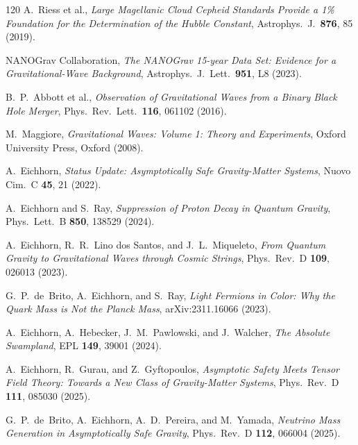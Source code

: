 \documentclass[12pt,a4paper]{article}
\begin{document}
\begin{thebibliography}{120}
A.~Riess et al.,
\textit{Large Magellanic Cloud Cepheid Standards Provide a 1\%
Foundation for the Determination of the Hubble Constant},
Astrophys.\ J.\ \textbf{876}, 85 (2019).


NANOGrav Collaboration,
\textit{The NANOGrav 15-year Data Set: Evidence for a
Gravitational-Wave Background},
Astrophys.\ J.\ Lett.\ \textbf{951}, L8 (2023).

B.~P.~Abbott et al.,
\textit{Observation of Gravitational Waves from a Binary Black Hole Merger},
Phys.\ Rev.\ Lett.\ \textbf{116}, 061102 (2016).

M.~Maggiore,
\textit{Gravitational Waves: Volume 1: Theory and Experiments},
Oxford University Press, Oxford (2008).


A.~Eichhorn,
\textit{Status Update: Asymptotically Safe Gravity-Matter Systems},
Nuovo Cim.\ C \textbf{45}, 21 (2022).

A.~Eichhorn and S.~Ray,
\textit{Suppression of Proton Decay in Quantum Gravity},
Phys.\ Lett.\ B \textbf{850}, 138529 (2024).

A.~Eichhorn, R.~R.~Lino dos Santos, and J.~L.~Miqueleto,
\textit{From Quantum Gravity to Gravitational Waves through Cosmic Strings},
Phys.\ Rev.\ D \textbf{109}, 026013 (2023).

G.~P.~de~Brito, A.~Eichhorn, and S.~Ray,
\textit{Light Fermions in Color: Why the Quark Mass is Not the Planck Mass},
arXiv:2311.16066 (2023).

A.~Eichhorn, A.~Hebecker, J.~M.~Pawlowski, and J.~Walcher,
\textit{The Absolute Swampland},
EPL \textbf{149}, 39001 (2024).

A.~Eichhorn, R.~Gurau, and Z.~Gyftopoulos,
\textit{Asymptotic Safety Meets Tensor Field Theory: Towards a New Class of
Gravity-Matter Systems},
Phys.\ Rev.\ D \textbf{111}, 085030 (2025).

G.~P.~de~Brito, A.~Eichhorn, A.~D.~Pereira, and M.~Yamada,
\textit{Neutrino Mass Generation in Asymptotically Safe Gravity},
Phys.\ Rev.\ D \textbf{112}, 066004 (2025).


\end{thebibliography}
\end{document}
